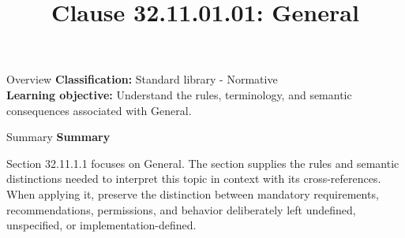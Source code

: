 \documentclass[10pt,letterpaper]{article}
\title{Clause 32.11.01.01: General}
\author{}
\date{}
\begin{document}
\maketitle
\begin{CornellOverviewBox}{Overview}
\textbf{Classification:} Standard library - Normative\\[2pt]
\textbf{Learning objective:} Understand the rules, terminology, and semantic consequences associated with General.
\end{CornellOverviewBox}\begin{CornellSummaryBox}{Summary}
{\sffamily\bfseries\color{Accent} Summary}\par\vspace{3pt}Section 32.11.1.1 focuses on General. The section supplies the rules and semantic distinctions needed to interpret this topic in context with its cross-references. When applying it, preserve the distinction between mandatory requirements, recommendations, permissions, and behavior deliberately left undefined, unspecified, or implementation-defined.
\end{CornellSummaryBox}
\end{document}

